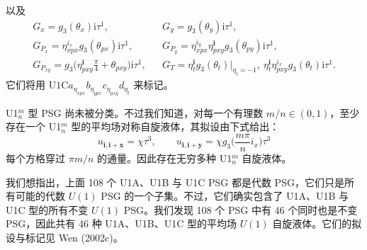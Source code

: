 以及
\begin{equation*}
\begin{array}{rcl}
G_{x}=g_{3}(\theta_{x})\mathrm{i}\tau^{1}, & & G_{y}=g_{3}(\theta_{y})\mathrm{i}\tau^{1},\\[2pt]
G_{P_{x}}=\eta_{xpx}^{i_{x}}g_{3}(\theta_{px})\mathrm{i}\tau^{1}, & & G_{P_{y}}=\eta_{xpx}^{i_{y}}\eta_{pxy}^{\pmb{i}}g_{3}(\theta_{py})\mathrm{i}\tau^{1},\\[2pt]
G_{P_{xy}}=g_{3}\big(\eta_{pxy}^{\pmb{i}}\frac{\pi}{4}+\theta_{pxy}\big)\mathrm{i}\tau^{1}, & & G_{T}=\eta_{t}^{\pmb{i}}g_{3}(\theta_{t})\big|_{\eta_{t}=-1},\ \eta_{t}^{\pmb{i}}\eta_{pxy}^{i_{x}}g_{3}(\theta_{t})\mathrm{i}\tau^{1}.
\end{array}
\tag{9.4.29}
\end{equation*}
它们将用 $\text{U1C}a_{\eta_{xpx}}b_{\eta_{ypx}}c_{\eta_{pxy}}d_{\eta_{t}}$ 来标记。

U1$_{n}^{m}$ 型 PSG 尚未被分类。不过我们知道，对每一个有理数 $m/n\in(0,1)$，至少存在一个 U1$_{n}^{m}$ 型的平均场对称自旋液体，其拟设由下式给出：
\begin{equation*}
u_{\pmb{i},\pmb{i}+\pmb{x}}=\chi\tau^{3},\qquad u_{\pmb{i},\pmb{i}+\pmb{y}}=\chi g_{3}\big(\frac{m\pi}{n}i_{x}\big)\tau^{3}
\tag{9.4.30}
\end{equation*}
每个方格穿过 $\pi m/n$ 的通量。因此存在无穷多种 U1$_{n}^{m}$ 自旋液体。

我们想指出，上面 108 个 U1A、U1B 与 U1C PSG 都是代数 PSG，它们只是所有可能的代数 $U(1)$ PSG 的一个子集。不过，它们确实包含了 U1A、U1B 与 U1C 型的所有不变 $U(1)$ PSG。我们发现 108 个 PSG 中有 46 个同时也是不变 PSG，因此共有 46 种 U1A、U1B、U1C 型的平均场 $U(1)$ 自旋液体。它们的拟设与标记见 Wen (2002c)。

